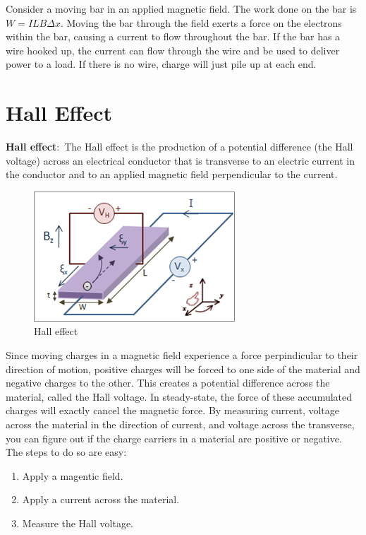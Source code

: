 \documentclass[nobib]{tufte-handout}
\newcommand{\defn}[2]{\noindent\textbf{#1}:\ #2}
\begin{document}
Consider a moving bar in an applied magnetic field. The work done on the bar 
is $ W= ILB \Delta x$. Moving the bar through the field exerts a force on 
the electrons within the bar, causing a current to flow throughout the bar. 
If the bar has a wire hooked up, the current can flow through the wire and be 
used to deliver power to a load. If there is no wire, charge will just pile 
up at each end. 

\section{Hall Effect}
\defn{Hall effect}{The Hall effect is the production of a potential 
difference (the Hall voltage) across an electrical conductor that 
is transverse to an electric current in the conductor and to an 
applied magnetic field perpendicular to the current}. 
\begin{figure}
    \center 
    \caption{Hall effect}
    \label{fig:hall}
    \includegraphics*{images/Hall_Effect_Measurement_Setup_for_Electrons.png}
\end{figure}
Since moving charges in a magnetic field experience a force perpindicular to their 
direction of motion, positive charges will be forced to one side of the material and 
negative charges to the other. This creates a potential difference across the material, 
called the Hall voltage. In steady-state, the force of these accumulated charges 
will exactly cancel the magnetic force. 
By measuring current, voltage across the material in the direction of current, 
and voltage across the transverse, you can figure out if the charge carriers 
in a material are positive or negative. 
The steps to do so are easy: 
\begin{enumerate}
    \item Apply a magentic field.
    \item Apply a current across the material. 
    \item Measure the Hall voltage. 
\end{enumerate}
\end{document}
